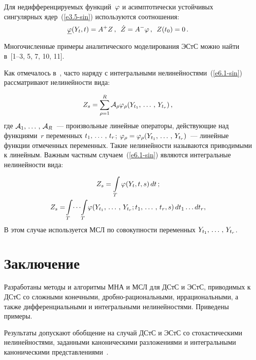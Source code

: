 \begin{multicols}{2}
Для недифференцируемых функций~$\varphi$ и асимптотически устойчивых
сингулярных ядер~(\ref{e3.5-sin}) используются соотношения:
\begin{equation*}
\underline{\vrp} (Y_t, t) = A^+ Z\,,\enskip
\dot Z = A^- \vrp\,,\enskip
Z(t_0)=0\,. %
\end{equation*}

Многочисленные примеры аналитического моделирования ЭСтС можно найти
в~[1--3, 5, 7, 10, 11].

Как отмечалось в~\cite{3-sin}, часто наряду с интегральными
нелинейностями~(\ref{e6.1-sin}) рассматривают нелинейности вида:

\columnbreak

\noindent
\begin{equation*}
Z_s =\sss_{\rho=1}^R \mathcal{A}_\rho \vrp_\rho (Y_{t_1}\tr Y_{t_r})\,, %
\end{equation*}
где $\mathcal{A}_1 ,\,\ldots\,,\, \mathcal{A}_R$~--- произвольные линейные операторы,
действующие над функциями~$r$ переменных  $t_1,\,\ldots\,,\, t_r$; $\vrp_\rho
\hm=\vrp_\rho (Y_{t_1} \tr Y_{t_r})$~--- линейные функции отмеченных
переменных. Такие нелинейности называются приводимыми к линейным.
Важным частным случаем~(\ref{e6.1-sin}) являются интегральные нелинейности вида:

\noindent
\begin{gather}
Z_s =\iii_T \vrp (Y_t, t, s)\, dt\,; \notag%
\\
Z_s =\!\iii_T \!\cdots\!\iii_T\! \vrp (Y_{t_1}\tr Y_{t_r}; t_1\tr t_r, s)\,dt_1
\ldots dt_r,\notag %
\end{gather}
В этом случае используется МСЛ по совокупности переменных  $Y_{t_1} ,\,\ldots\,,\, Y_{t_r}$.

\vspace*{-9pt}

\section{Заключение}

\vspace*{-2pt}

Разработаны методы и алгоритмы МНА и МСЛ для ДСтС и ЭСтС,
приводимых к ДСтС со сложными конечными, дроб\-но-ра\-ци\-о\-наль\-ны\-ми,
иррациональными, а также дифференциальными и интегральными нелинейностями.
Приведены примеры.

Результаты допускают обобщение на случай ДСтС и ЭСтС со
стохастическими нелинейностями, заданными каноническими разложениями и
интегральными каноническими  представлениями~\cite{1-sin, 3-sin, 11-sin}.


\end{multicols}
